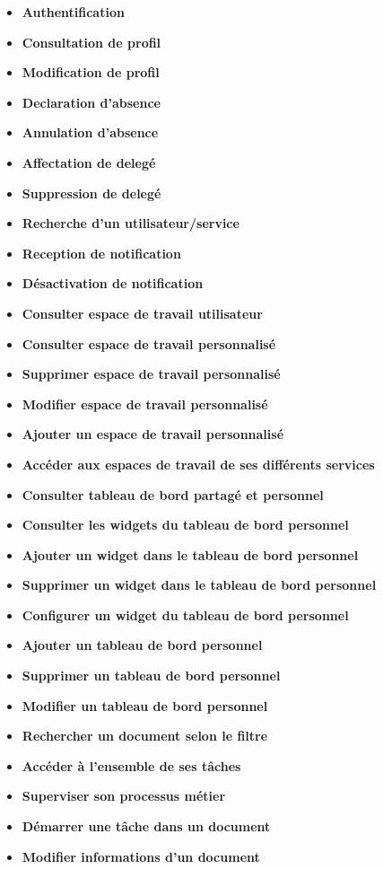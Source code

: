 \begin{itemize}
\item \textbf{Authentification}
\item \textbf{Consultation de profil}
\item \textbf{Modification de profil}
\item \textbf{Declaration d'absence}
\item \textbf{Annulation d'absence}
\item \textbf{Affectation de delegé}
\item \textbf{Suppression de delegé}
\item \textbf{Recherche d'un utilisateur/service}
\item \textbf{Reception de notification}
\item \textbf{Désactivation de notification}
\item \textbf{Consulter espace de travail utilisateur}
\item \textbf{Consulter espace de travail personnalisé}
\item \textbf{Supprimer espace de travail personnalisé}
\item \textbf{Modifier espace de travail personnalisé}
\item \textbf{Ajouter un espace de travail personnalisé}
\item \textbf{Accéder aux espaces de travail de ses différents services}
\item \textbf{Consulter tableau de bord partagé et personnel}
\item \textbf{Consulter les widgets du tableau de bord personnel}
\item \textbf{Ajouter un widget dans le tableau de bord personnel}
\item \textbf{Supprimer un widget dans le tableau de bord personnel}
\item \textbf{Configurer un widget du tableau de bord personnel}
\item \textbf{Ajouter un tableau de bord personnel}
\item \textbf{Supprimer un tableau de bord personnel}
\item \textbf{Modifier un tableau de bord personnel}
\item \textbf{Rechercher un document selon le filtre}
\item \textbf{Accéder à l'ensemble de ses tâches}
\item \textbf{Superviser son processus métier}
\item \textbf{Démarrer une tâche dans un document}
\item \textbf{Modifier informations d'un document}

\end{itemize}
